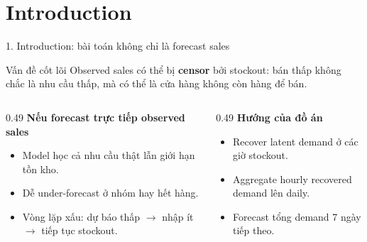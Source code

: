 \documentclass[aspectratio=169,10pt]{beamer}
\begin{document}
\section{Introduction}
\begin{frame}{1. Introduction: bài toán không chỉ là forecast sales}
    \begin{block}{Vấn đề cốt lõi}
    Observed sales có thể bị \textbf{censor} bởi stockout: bán thấp không chắc là nhu cầu thấp, mà có thể là cửa hàng không còn hàng để bán.
    \end{block}
    \begin{columns}[T]
        \begin{column}{0.49\linewidth}
            \textbf{Nếu forecast trực tiếp observed sales}
            \begin{itemize}
                \item Model học cả nhu cầu thật lẫn giới hạn tồn kho.
                \item Dễ under-forecast ở nhóm hay hết hàng.
                \item Vòng lặp xấu: dự báo thấp $\rightarrow$ nhập ít $\rightarrow$ tiếp tục stockout.
            \end{itemize}
        \end{column}
        \begin{column}{0.49\linewidth}
            \textbf{Hướng của đồ án}
            \begin{itemize}
                \item Recover latent demand ở các giờ stockout.
                \item Aggregate hourly recovered demand lên daily.
                \item Forecast tổng demand 7 ngày tiếp theo.
            \end{itemize}
        \end{column}
    \end{columns}
\end{frame}
\end{document}

